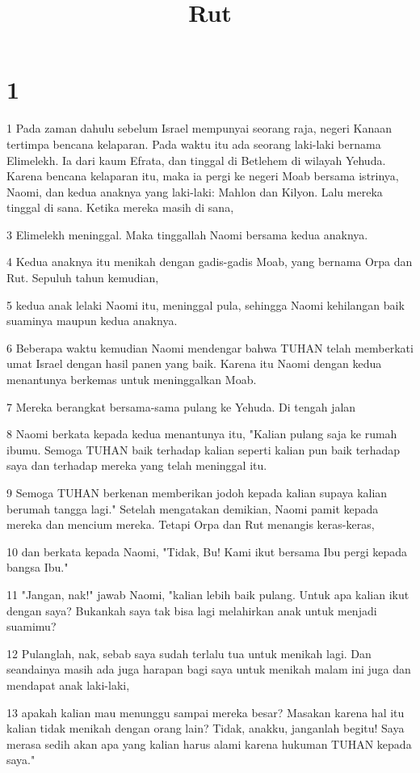 

\title{Rut}


\chapter{1}

\par 1 Pada zaman dahulu sebelum Israel mempunyai seorang raja, negeri Kanaan tertimpa bencana kelaparan. Pada waktu itu ada seorang laki-laki bernama Elimelekh. Ia dari kaum Efrata, dan tinggal di Betlehem di wilayah Yehuda. Karena bencana kelaparan itu, maka ia pergi ke negeri Moab bersama istrinya, Naomi, dan kedua anaknya yang laki-laki: Mahlon dan Kilyon. Lalu mereka tinggal di sana. Ketika mereka masih di sana,
\par 3 Elimelekh meninggal. Maka tinggallah Naomi bersama kedua anaknya.
\par 4 Kedua anaknya itu menikah dengan gadis-gadis Moab, yang bernama Orpa dan Rut. Sepuluh tahun kemudian,
\par 5 kedua anak lelaki Naomi itu, meninggal pula, sehingga Naomi kehilangan baik suaminya maupun kedua anaknya.
\par 6 Beberapa waktu kemudian Naomi mendengar bahwa TUHAN telah memberkati umat Israel dengan hasil panen yang baik. Karena itu Naomi dengan kedua menantunya berkemas untuk meninggalkan Moab.
\par 7 Mereka berangkat bersama-sama pulang ke Yehuda. Di tengah jalan
\par 8 Naomi berkata kepada kedua menantunya itu, "Kalian pulang saja ke rumah ibumu. Semoga TUHAN baik terhadap kalian seperti kalian pun baik terhadap saya dan terhadap mereka yang telah meninggal itu.
\par 9 Semoga TUHAN berkenan memberikan jodoh kepada kalian supaya kalian berumah tangga lagi." Setelah mengatakan demikian, Naomi pamit kepada mereka dan mencium mereka. Tetapi Orpa dan Rut menangis keras-keras,
\par 10 dan berkata kepada Naomi, "Tidak, Bu! Kami ikut bersama Ibu pergi kepada bangsa Ibu."
\par 11 "Jangan, nak!" jawab Naomi, "kalian lebih baik pulang. Untuk apa kalian ikut dengan saya? Bukankah saya tak bisa lagi melahirkan anak untuk menjadi suamimu?
\par 12 Pulanglah, nak, sebab saya sudah terlalu tua untuk menikah lagi. Dan seandainya masih ada juga harapan bagi saya untuk menikah malam ini juga dan mendapat anak laki-laki,
\par 13 apakah kalian mau menunggu sampai mereka besar? Masakan karena hal itu kalian tidak menikah dengan orang lain? Tidak, anakku, janganlah begitu! Saya merasa sedih akan apa yang kalian harus alami karena hukuman TUHAN kepada saya."
